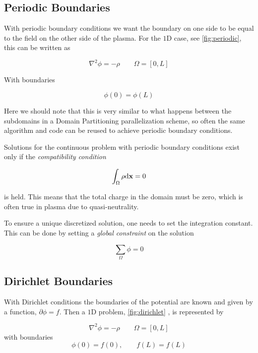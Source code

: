 \subsection{Periodic Boundaries}
	\label{sec:bnd_periodic}
	With periodic boundary conditions we want the boundary on one side to be equal
	to the field on the other side of the plasma. For the \(1\)D case, see \cref{fig:periodic},
	this can be written as

	\begin{equation}
		\nabla^2 \phi = -\rho \qquad \Omega = [0,L]
	\end{equation}

	With boundaries

	\begin{equation}
		\phi(0) = \phi(L)
	\end{equation}

	Here we should note that this is very similar to what happens between the subdomains
	in a Domain Partitioning parallelization scheme, so often the same algorithm and code
	can be reused to achieve periodic boundary conditions.

	Solutions for the continuous problem with periodic boundary conditions exist only if
	the \textit{compatibility condition} \citep{trottenberg_multigrid_2000}

	\begin{equation}
			\int_\Omega \rho\differential \vb{x} = 0
	\end{equation}

	is held. This means that the total charge in the domain must be zero, which
	is often true in plasma due to quasi-neutrality.

	To ensure a unique discretized solution, one needs to set the integration constant. This can be done
	by setting a \textit{global constraint} on the solution

	\begin{equation}
		\sum_{\Omega} \phi = 0 \label{eq:global_constraint}
	\end{equation}

\subsection{Dirichlet Boundaries}
	With Dirichlet conditions the boundaries of the potential are known and given by a function,
	\(\partial \phi = f\). Then a \(1\)D problem, \cref{fig:dirichlet} , is represented by

	\begin{equation}
		\nabla^2 \phi = -\rho \qquad \Omega = [0,L]
	\end{equation}
	with boundaries
	\begin{equation}
		\phi(0) =  f(0), \qquad f(L) =   f(L)
	\end{equation}


